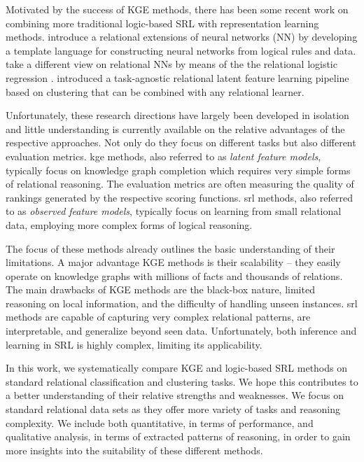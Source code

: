 Motivated by the success of KGE methods, there has been some recent work on combining more traditional logic-based SRL with representation learning methods.
\cite{Sourek:2015:LRN:2996831.2996838}   introduce a relational extensions of neural networks (NN) by developing a template language for constructing neural networks from logical rules and data.
\cite{Kazemi2018} take a different view on relational NNs by means of the the relational logistic regression \cite{KazemiLR2014}.
\cite{Dumancic2017} introduced a task-agnostic relational latent feature learning pipeline based on clustering that can be combined with any relational learner.





Unfortunately, these research directions have largely been developed in isolation and little understanding is currently available on the relative advantages of the respective approaches.
Not only do they focus on different tasks but also different evaluation metrics.
\gls{kge} methods, also referred to as \textit{latent feature models}, typically focus on knowledge graph completion which requires very simple forms of relational reasoning. The evaluation metrics are often measuring the quality of rankings generated by the respective scoring functions. 
\gls{srl} methods, also referred to as \textit{observed feature models}, typically focus on learning from small relational data, employing more complex forms of logical reasoning.


The focus of these methods already outlines the basic understanding of their limitations.
A major advantage KGE methods is their scalability -- they easily operate on knowledge graphs with millions of facts and thousands of relations.
The main drawbacks of KGE methods are the black-box nature, limited reasoning on local information, and the difficulty of handling unseen instances.
\gls{srl} methods are capable of capturing very complex relational patterns, are interpretable, and generalize beyond seen data. Unfortunately, both inference and learning in SRL is highly complex, limiting its applicability.



In this work, we systematically compare KGE and logic-based SRL methods on standard relational classification and clustering tasks. We hope this contributes to a better understanding of their relative strengths and weaknesses. We focus on standard relational data sets as they offer more variety of tasks and reasoning complexity. We include both quantitative, in terms of performance, and qualitative analysis, in terms of extracted patterns of reasoning, in order to gain more insights into the suitability of these different methods. 
 








